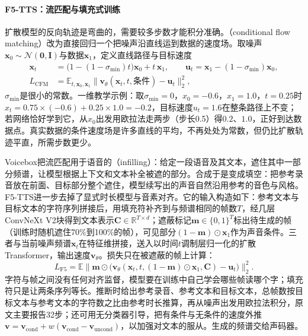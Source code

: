 \paragraph{F5-TTS：流匹配与填充式训练}
扩散模型的反向轨迹是弯曲的，需要较多步数才能积分准确。（conditional flow matching）改为直接回归一个把噪声沿直线运到数据的速度场\cite{lipman2023flowmatching}。取噪声$\bm{x}_0\sim\mathcal{N}(\bm{0},\bm{I})$与数据$\bm{x}_1$，定义直线路径与目标速度
\begin{equation}
\begin{aligned}
  \bm{x}_t&=\bigl(1-(1-\sigma_{\min})t\bigr)\bm{x}_0+t\,\bm{x}_1,\qquad
  \bm{u}_t=\bm{x}_1-(1-\sigma_{\min})\bm{x}_0,\\
  L_{\mathrm{CFM}}&=\mathbb{E}_{t,\bm{x}_0,\bm{x}_1}\bigl\lVert\bm{v}_\theta(\bm{x}_t,t,\text{条件})-\bm{u}_t\bigr\rVert_2^2,
\end{aligned}
  \label{eq:nlp-speech-cfm}
\end{equation}
$\sigma_{\min}$是很小的常数。一维教学示例：取$\sigma_{\min}=0$，$x_0=-0.6$，$x_1=1.0$，$t=0.25$时$x_t=0.75\times(-0.6)+0.25\times1.0=-0.2$，目标速度$u_t=1.6$在整条路径上不变；若网络恰好学到它，从$x_0$出发用欧拉法走两步（步长0.5）得$0.2$、$1.0$，正好到达数据点。真实数据的条件速度场是许多直线的平均，不再处处为常数，但仍比扩散轨迹平直，所需步数更少。

Voicebox把流匹配用于语音的（infilling）：给定一段语音及其文本，遮住其中一部分频谱，让模型根据上下文和文本补全被遮的部分\cite{nlp-speech-le2023voicebox}。合成于是变成填空：把参考录音放在前面、目标部分整个遮住，模型续写出的声音自然沿用参考的音色与风格。F5-TTS进一步去掉了显式时长模型与音素对齐。它的输入构造如下：参考文本与目标文本的字符序列拼接后，用填充符补齐到与频谱相同的帧数$T$，经几层ConvNeXt V2块\cite{woo2023convnextv2}得到文本表示$\bm{C}\in\mathbb{R}^{T\times d}$；遮蔽标记$\bm{m}\in\{0,1\}^{T}$标出待生成的帧（训练时随机遮住70\%到100\%的帧），可见部分$(1-\bm{m})\odot\bm{x}_1$作为声音条件。三者与当前噪声频谱$\bm{x}_t$在特征维拼接，送入以时间$t$调制层归一化的扩散Transformer\cite{peebles2023dit}，输出速度$\bm{v}_\theta$。损失只在被遮蔽的帧上计算：
\begin{equation}
  L_{\mathrm{F5}}=\mathbb{E}\bigl\lVert\bm{m}\odot\bigl(\bm{v}_\theta(\bm{x}_t,t,(1-\bm{m})\odot\bm{x}_1,\bm{C})-\bm{u}_t\bigr)\bigr\rVert_2^2 .
  \label{eq:nlp-speech-f5-loss}
\end{equation}
字符与帧之间没有任何对齐监督，模型要在训练中自己学会哪些帧读哪个字；填充符只是让两条序列等长。推断时给出参考录音、参考文本和目标文本，总帧数按目标文本与参考文本的字符数之比由参考时长推算，再从噪声出发用欧拉法积分，原文主要报告32步；还可用无分类器引导，把有条件与无条件的速度外推$\bm{v}=\bm{v}_{\mathrm{cond}}+w(\bm{v}_{\mathrm{cond}}-\bm{v}_{\mathrm{uncond}})$，以加强对文本的服从。生成的频谱交给声码器。

